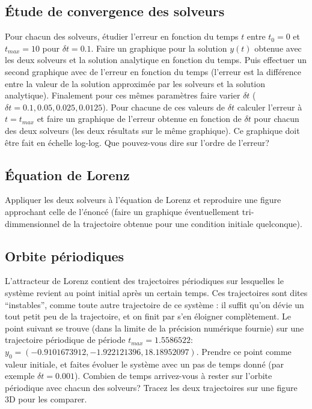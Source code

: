 \documentclass[a4paper,10pt]{article}
\begin{document}
\subsection*{Étude de convergence des solveurs}

Pour chacun des solveurs, étudier l'erreur en fonction du temps $t$ entre $t_0=0$ et $t_{max}=10$ pour $\delta t=0.1$. Faire un graphique 
pour la solution $y(t)$ obtenue avec les deux solveurs et la solution analytique en fonction du temps. Puis effectuer un second graphique
avec de l'erreur en fonction du temps (l'erreur est la différence entre la valeur de la solution approximée par les solveurs et la solution analytique).
Finalement pour ces mêmes paramètres faire varier $\delta t$ ($\delta t=0.1,0.05, 0.025, 0.0125$). Pour chacune de ces valeurs de $\delta t$ calculer l'erreur à $t=t_{max}$
et faire un graphique de l'erreur obtenue en fonction de $\delta t$ pour chacun des deux solveurs (les deux résultats sur le même graphique).
Ce graphique doit être fait en échelle log-log. Que pouvez-vous dire sur l'ordre de l'erreur?

\subsection*{Équation de Lorenz}

Appliquer les deux solveurs à l'équation de Lorenz et reproduire une figure approchant celle de l'énoncé (faire un graphique éventuellement tri-dimmensionnel de la trajectoire obtenue
pour une condition initiale quelconque).

\subsection*{Orbite périodiques}

L’attracteur de Lorenz contient des trajectoires périodiques sur lesquelles
le système revient au point initial après un certain temps. Ces trajectoires sont dites
``instables'', comme toute autre trajectoire de ce système : il suffit qu’on dévie un
tout petit peu de la trajectoire, et on finit par s’en éloigner complètement. Le
point suivant se trouve (dans la limite de la précision numérique fournie) sur
une trajectoire périodique de période $t_{max}=1.5586522$:
$y_0=(-0.9101673912,-1.922121396,18.18952097)$.
Prendre ce point comme valeur initiale, et faites évoluer le système avec un pas de
temps donné (par exemple $\delta t = 0.001$). Combien de temps arrivez-vous à rester
sur l’orbite périodique avec chacun des solveurs?
Tracez les deux trajectoires sur une figure 3D pour les comparer.
\end{document}
